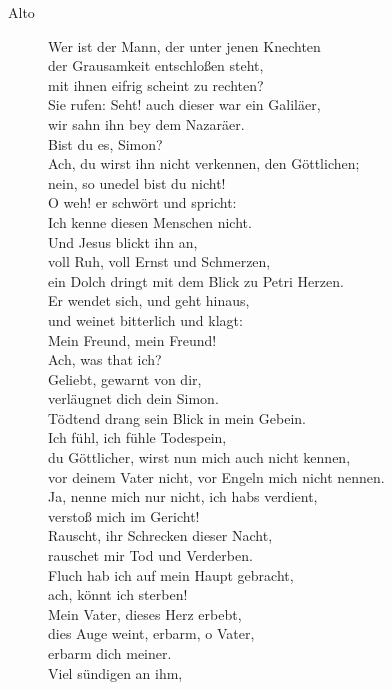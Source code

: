 \documentclass[parskip=full]{scrreprt}
\begin{document}
\begin{description}
	\item[Alto]
	Wer ist der Mann, der unter jenen Knechten\\
	der Grausamkeit entschloßen steht,\\
	mit ihnen eifrig scheint zu rechten?\\
	Sie rufen: Seht! auch dieser war ein Galiläer,\\
	wir sahn ihn bey dem Nazaräer.\\
	Bist du es, Simon?\\
	Ach, du wirst ihn nicht verkennen, den Göttlichen;\\
	nein, so unedel bist du nicht!\\
	O weh! er schwört und spricht:\\
	Ich kenne diesen Menschen nicht.\\
	Und Jesus blickt ihn an,\\
	voll Ruh, voll Ernst und Schmerzen,\\
	ein Dolch dringt mit dem Blick zu Petri Herzen.\\
	Er wendet sich, und geht hinaus,\\
	und weinet bitterlich und klagt:\\
	Mein Freund, mein Freund!\\
	Ach, was that ich?\\
	Geliebt, gewarnt von dir,\\
	verläugnet dich dein Simon.\\
	Tödtend drang sein Blick in mein Gebein.\\
	Ich fühl, ich fühle Todespein,\\
	du Göttlicher, wirst nun mich auch nicht kennen,\\
	vor deinem Vater nicht, vor Engeln mich nicht nennen.\\
	Ja, nenne mich nur nicht, ich habs verdient,\\
	verstoß mich im Gericht!\\
	Rauscht, ihr Schrecken dieser Nacht,\\
	rauschet mir Tod und Verderben.\\
	Fluch hab ich auf mein Haupt gebracht,\\
	ach, könnt ich sterben!\\
	Mein Vater, dieses Herz erbebt,\\
	dies Auge weint, erbarm, o Vater,\\
	erbarm dich meiner.\\
	Viel sündigen an ihm,\\

\end{description}
\end{document}
